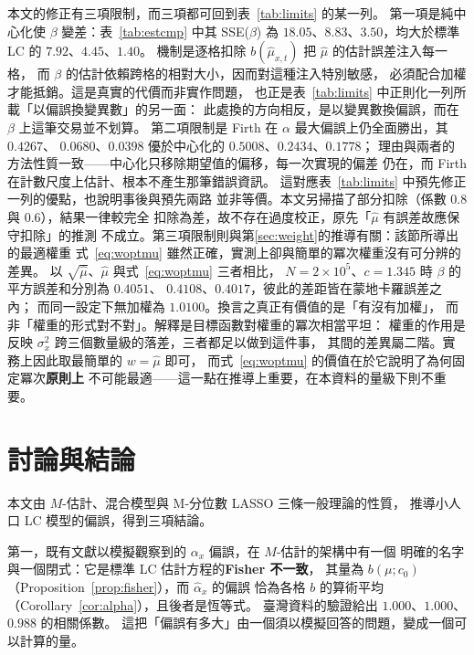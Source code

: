 \documentclass[UTF8, fontset=macnew, a4paper, 12pt]{ctexart}
\begin{document}
本文的修正有三項限制，而三項都可回到表~\ref{tab:limits} 的某一列。
第一項是純中心化使 $\beta$ 變差：表~\ref{tab:estcmp} 中其 SSE($\beta$)
為 $18.05$、$8.83$、$3.50$，均大於標準 LC 的 $7.92$、$4.45$、$1.40$。
機制是逐格扣除 $b(\hat\mu_{x,t})$ 把 $\hat\mu$ 的估計誤差注入每一格，
而 $\beta$ 的估計依賴跨格的相對大小，因而對這種注入特別敏感，
必須配合加權才能抵銷。這是真實的代價而非實作問題，
也正是表~\ref{tab:limits} 中正則化一列所載「以偏誤換變異數」的另一面：
此處換的方向相反，是以變異數換偏誤，而在 $\beta$ 上這筆交易並不划算。
第二項限制是 Firth 在 $\alpha$ 最大偏誤上仍全面勝出，其 $0.4267$、
$0.0680$、$0.0398$ 優於中心化的 $0.5008$、$0.2434$、$0.1778$；
理由與兩者的方法性質一致——中心化只移除期望值的偏移，每一次實現的偏差
仍在，而 Firth 在計數尺度上估計、根本不產生那筆錯誤資訊。
這對應表~\ref{tab:limits} 中預先修正一列的優點，也說明事後與預先兩路
並非等價。本文另掃描了部分扣除（係數 $0.8$ 與 $0.6$），結果一律較完全
扣除為差，故不存在過度校正，原先「$\hat\mu$ 有誤差故應保守扣除」的推測
不成立。第三項限制則與第\ref{sec:weight}的推導有關：該節所導出的最適權重
式~\eqref{eq:woptmu} 雖然正確，實測上卻與簡單的冪次權重沒有可分辨的差異。
以 $\sqrt{\hat\mu}$、$\hat\mu$ 與式~\eqref{eq:woptmu} 三者相比，
$N=2\times10^5$、$c=1.345$ 時 $\beta$ 的平方誤差和分別為 $0.4051$、
$0.4108$、$0.4017$，彼此的差距皆在蒙地卡羅誤差之內；
而同一設定下無加權為 $1.0100$。換言之真正有價值的是「有沒有加權」，
而非「權重的形式對不對」。解釋是目標函數對權重的冪次相當平坦：
權重的作用是反映 $\sigma_x^2$ 跨三個數量級的落差，三者都足以做到這件事，
其間的差異屬二階。實務上因此取最簡單的 $w=\hat\mu$ 即可，
而式~\eqref{eq:woptmu} 的價值在於它說明了為何固定冪次\textbf{原則上}
不可能最適——這一點在推導上重要，在本資料的量級下則不重要。

\section{討論與結論}\label{sec:disc}

本文由 $M$-估計、混合模型與 M-分位數 LASSO 三條一般理論的性質，
推導小人口 LC 模型的偏誤，得到三項結論。

第一，既有文獻以模擬觀察到的 $\alpha_x$ 偏誤，在 $M$-估計的架構中有一個
明確的名字與一個閉式：它是標準 LC 估計方程的\textbf{Fisher 不一致}，
其量為 $b(\mu;c_0)$（Proposition~\ref{prop:fisher}），而 $\hat\alpha_x$ 的偏誤
恰為各格 $b$ 的算術平均（Corollary~\ref{cor:alpha}），且後者是恆等式。
臺灣資料的驗證給出 $1.000$、$1.000$、$0.988$ 的相關係數。
這把「偏誤有多大」由一個須以模擬回答的問題，變成一個可以計算的量。
\end{document}
